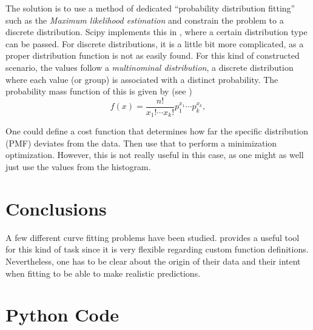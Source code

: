 \documentclass[10pt, a4paper]{article}
\begin{document}
The solution is to use a method of dedicated ``probability distribution fitting'' such as the \textit{Maximum likelihood estimation} and constrain the problem to a discrete distribution. Scipy implements this in , where a certain distribution type can be passed. \cite{scipy_doc_dist_fit} For discrete distributions, it is a little bit more complicated, as a proper distribution function is not as easily found. For this kind of constructed scenario, the values follow a \textit{multinominal distribution}, a discrete distribution where each value (or group) is associated with a distinct probability. The probability mass function of this is given by (see \cite{scipy_doc_multinominal})
\[
  f(x) = \frac{n!}{x_1! \cdots x_k!} p_1^{x_1} \cdots p_k^{x_k},
\]

One could define a cost function that determines how far the specific distribution (PMF) deviates from the data. Then use that to perform a minimization optimization. However, this is not really useful in this case, as one might as well just use the values from the histogram.


\section{Conclusions}
A few different curve fitting problems have been studied.  provides a useful tool for this kind of task since it is very flexible regarding custom function definitions. Nevertheless, one has to be clear about the origin of their data and their intent when fitting to be able to make realistic predictions.


\printbibheading

\begin{refsection}
\nocite{*}
\printbibliography[heading=subbibliography,title={Literature}]
\end{refsection}

\begin{refsection}
\nocite{*}
\printbibliography[heading=subbibliography,title={Software Used}]
\end{refsection}

\pagebreak
\appendix
\section{Python Code}\label{app:script}
\end{document}
